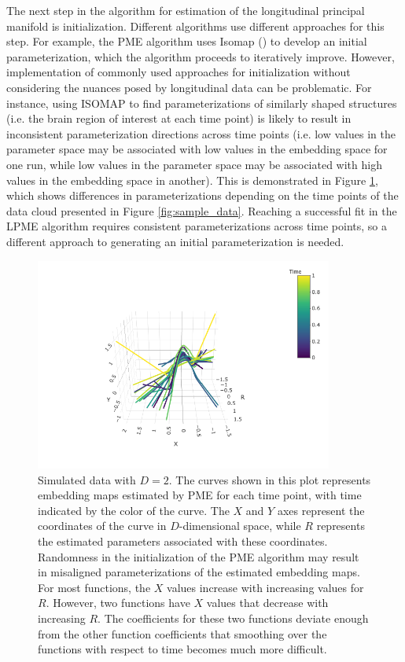 \documentclass[11pt,reqno]{article}
\theoremstyle{definition}
\begin{document}
The next step in the algorithm for estimation of the longitudinal principal manifold is initialization. Different algorithms use different approaches for this step. For example, the PME algorithm uses Isomap (\cite{tenenbaumGlobalGeometricFramework2000}) to develop an initial parameterization, which the algorithm proceeds to iteratively improve. However, implementation of commonly used approaches for initialization without considering the nuances posed by longitudinal data can be problematic. For instance, using ISOMAP to find parameterizations of similarly shaped structures (i.e. the brain region of interest at each time point) is likely to result in inconsistent parameterization directions across time points (i.e. low values in the parameter space may be associated with low values in the embedding space for one run, while low values in the parameter space may be associated with high values in the embedding space in another). This is demonstrated in Figure \ref{fig:inconsistent_parameterization}, which shows differences in parameterizations depending on the time points of the data cloud presented in Figure \ref{fig:sample_data}. Reaching a successful fit in the LPME algorithm requires consistent parameterizations across time points, so a different approach to generating an initial parameterization is needed.

\begin{figure}[h]
  \centering
  \includegraphics[height=7cm]{inconsistent_parameterization}
  \caption{Simulated data with $D = 2$. The curves shown in this plot represents embedding maps estimated by PME for each time point, with time indicated by the color of the curve. The $X$ and $Y$ axes represent the coordinates of the curve in $D$-dimensional space, while $R$ represents the estimated parameters associated with these coordinates. Randomness in the initialization of the PME algorithm may result in misaligned parameterizations of the estimated embedding maps. For most functions, the $X$ values increase with increasing values for $R$. However, two functions have $X$ values that decrease with increasing $R$. The coefficients for these two functions deviate enough from the other function coefficients that smoothing over the functions with respect to time becomes much more difficult.}
  \label{fig:inconsistent_parameterization}
\end{figure}
\end{document}
